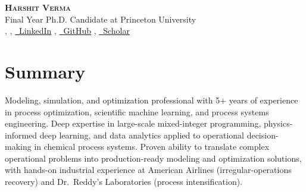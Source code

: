\documentclass{resume}
\begin{document}

\begin{center}
    {\Huge \bfseries \scshape Harshit Verma}\\
    \vspace{1pt}
    {\small Final Year Ph.D. Candidate at Princeton University}\\
    \vspace{1pt}
    \small
     \sep
     \sep
    \href{https://linkedin.com/in/harshit-verma-cbe}{\faLinkedin\ {LinkedIn}} \sep
    \href{https://github.com/hverma99}{\faGithub\ {GitHub}} \sep
    \href{https://scholar.google.com/citations?user=u9gTEYcAAAAJ&hl=en&authuser=1}{\aiGoogleScholar\ {Scholar}}
\end{center}


\section{\bfseries Summary}
\justifying\noindent\small
Modeling, simulation, and optimization professional with 5+ years of experience in process optimization, 
scientific machine learning, and process systems engineering.
Deep expertise in large-scale mixed-integer programming, physics-informed deep learning, and data analytics
applied to operational decision-making in chemical process systems.
Proven ability to translate complex operational problems into production-ready modeling and optimization solutions,
with hands-on industrial experience at American Airlines (irregular-operations recovery) and Dr.\ Reddy's Laboratories (process intensification).
\par

\end{document}
